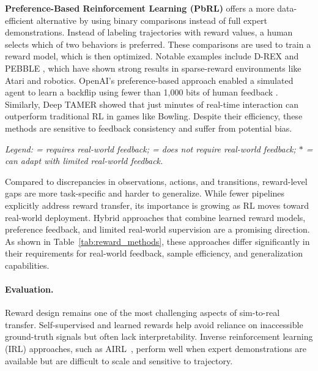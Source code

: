 \textbf{Preference-Based Reinforcement Learning (PbRL)} offers a more data-efficient alternative by using binary comparisons instead of full expert demonstrations. Instead of labeling trajectories with reward values, a human selects which of two behaviors is preferred. These comparisons are used to train a reward model, which is then optimized. Notable examples include D-REX \cite{Brown2019} and PEBBLE \cite{Lee2021}, which have shown strong results in sparse-reward environments like Atari and robotics. OpenAI’s preference-based approach enabled a simulated agent to learn a backflip using fewer than 1{,}000 bits of human feedback \cite{Christiano2017}. Similarly, Deep TAMER \cite{Warnell2017} showed that just minutes of real-time interaction can outperform traditional RL in games like Bowling. Despite their efficiency, these methods are sensitive to feedback consistency and suffer from potential bias.

\begin{table*}[t]
\centering
\caption{Comparison of Reward-Level Transfer Methods}
\label{tab:reward_methods}
\vspace{0.2em}
\small\textit{
Legend:  = requires real-world feedback;  = does not require real-world feedback; $\ast$ = can adapt with limited real-world feedback.}
\end{table*}

Compared to discrepancies in observations, actions, and transitions, reward-level gaps are more task-specific and harder to generalize. While fewer \simtoreal pipelines explicitly address reward transfer, its importance is growing as RL moves toward real-world deployment. Hybrid approaches that combine learned reward models, preference feedback, and limited real-world supervision are a promising direction. As shown in Table~\ref{tab:reward_methods}, these approaches differ significantly in their requirements for real-world feedback, sample efficiency, and generalization capabilities.

\paragraph{Evaluation.} Reward design remains one of the most challenging aspects of sim-to-real transfer. Self-supervised and learned rewards help avoid reliance on inaccessible ground-truth signals but often lack interpretability. Inverse reinforcement learning (IRL) approaches, such as AIRL~\cite{Fu2018}, perform well when expert demonstrations are available but are difficult to scale and sensitive to trajectory.